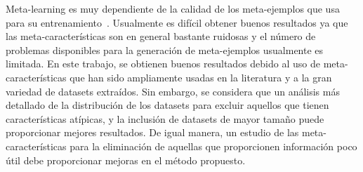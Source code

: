 Meta-learning es muy dependiente de la calidad de los meta-ejemplos que usa para su entrenamiento~\cite{gomes2012combining}. Usualmente es difícil obtener buenos resultados ya que las meta-características son en general bastante ruidosas y el número de problemas disponibles para la generación de meta-ejemplos usualmente es limitada. En este trabajo, se obtienen buenos resultados debido al uso de meta-características que han sido ampliamente usadas en la literatura y a la gran variedad de datasets extraídos. Sin embargo, se considera que un análisis más detallado de la distribución de los datasets para excluir aquellos que tienen características atípicas, y la inclusión de datasets de mayor tamaño puede proporcionar mejores resultados. De igual manera, un estudio de las meta-características para la eliminación de aquellas que proporcionen información poco útil debe proporcionar mejoras en el método propuesto.






